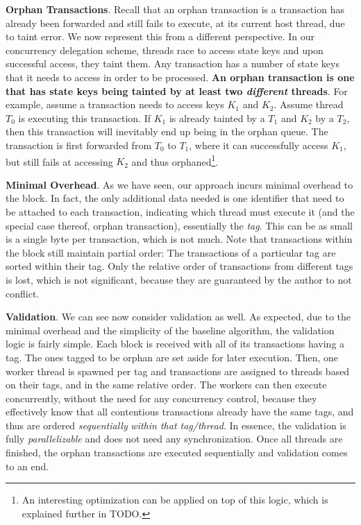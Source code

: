 \textbf{Orphan Transactions}. Recall that an orphan transaction is a transaction has already been
forwarded and still fails to execute, at its current host thread, due to taint error. We now
represent this from a different perspective. In our concurrency delegation scheme, threads race to
access state keys and upon successful access, they taint them. Any transaction has a number of state
keys that it needs to access in order to be processed. \textbf{An orphan transaction is one that has
state keys being tainted by at least two \textit{different} threads}. For example, assume a
transaction needs to access keys $K_{1}$ and $K_{2}$. Assume thread $T_{0}$ is executing this
transaction. If $K_{1}$ is already tainted by a $T_{1}$ and $K_{2}$ by a $T_{2}$, then this
transaction will inevitably end up being in the orphan queue. The transaction is first forwarded
from $T_{0}$ to $T_{1}$, where it can successfully access $K_{1}$, but still fails at accessing
$K_{2}$ and thus orphaned\footnote{An interesting optimization can be applied on top of this logic,
which is explained further in TODO.}.

\textbf{Minimal Overhead}. As we have seen, our approach incurs minimal overhead to the block. In
fact, the only additional data needed is one identifier that need to be attached to each
transaction, indicating which thread must execute it (and the special case thereof, orphan
transaction), essentially the \textit{tag}. This can be as small is a single byte per transaction,
which is not much. Note that transactions within the block still maintain partial order: The
transactions of a particular tag are sorted within their tag. Only the relative order of
transactions from different tags is lost, which is not significant, because they are guaranteed by
the author to not conflict.

\textbf{Validation}. We can see now consider validation as well. As expected, due to the minimal
overhead and the simplicity of the baseline algorithm, the validation logic is fairly simple. Each
block is received with all of its transactions having a tag. The ones tagged to be orphan are set
aside for later execution. Then, one worker thread is spawned per tag and transactions are assigned
to threads based on their tags, and in the same relative order. The workers can then execute
concurrently, without the need for any concurrency control, because they effectively know that all
contentious transactions already have the same tags, and thus are ordered \textit{sequentially}
\textit{within that tag/thread}. In essence, the validation is fully \textit{parallelizable} and
does not need any synchronization. Once all threads are finished, the orphan transactions are
executed sequentially and validation comes to an end.

